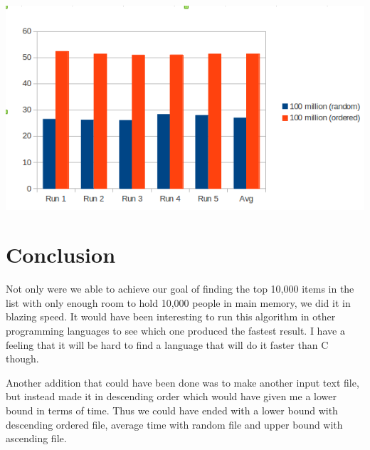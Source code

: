 \documentclass[12pt,letterpaper]{article}
\begin{document}
\includegraphics[scale=.5]{100million.png}






\section{Conclusion}

Not only were we able to achieve our goal of finding the top 10,000 items in the list with only enough room to hold 10,000 people in main memory, we did it in blazing speed. It would have been interesting to run this algorithm in other programming languages to see which one produced the fastest result. I have a feeling that it will be hard to find a language that will do it faster than C though. 

Another addition that could have been done was to make another input text file, but instead made it in descending order which would have given me a lower bound in terms of time. Thus we could have ended with a lower bound with descending ordered file, average time with random file and upper bound with ascending file.
\end{document}
